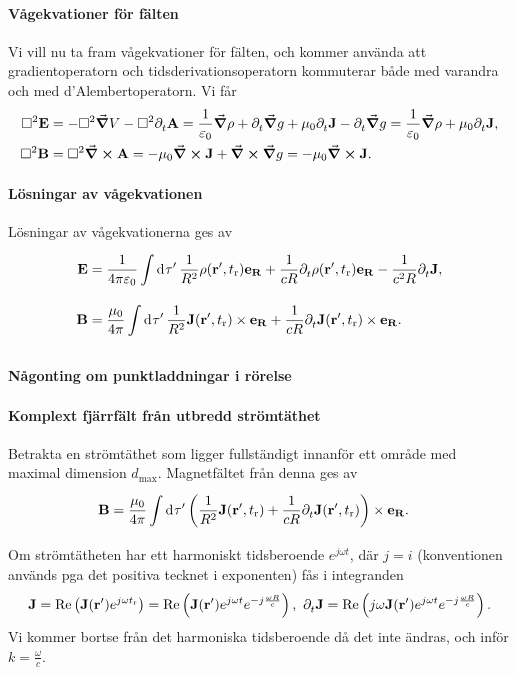 \paragraph{Vågekvationer för fälten}
Vi vill nu ta fram vågekvationer för fälten, och kommer använda att gradientoperatorn och tidsderivationsoperatorn kommuterar både med varandra och med d'Alembertoperatorn. Vi får
\begin{align*}
	\Box^{2}{\vb{E}} &= -\Box^{2}{\grad{V}} - \Box^{2}{\partial_{t}^{}\vb{A}} = \frac{1}{\varepsilon_{0}}\grad{\rho} + \partial_{t}^{}\grad{g} + \mu_{0}\partial_{t}^{}\vb{J} - \partial_{t}^{}\grad{g} = \frac{1}{\varepsilon_{0}}\grad{\rho} + \mu_{0}\partial_{t}^{}\vb{J}, \\
	\Box^{2}{\vb{B}} &= \Box^{2}{\curl{\vb{A}}} = -\mu_{0}\curl{\vb{J}} + \curl{\grad{g}} = -\mu_{0}\curl{\vb{J}}.
\end{align*}

\paragraph{Lösningar av vågekvationen}
Lösningar av vågekvationerna ges av
\begin{align*}
	\vb{E} &= \frac{1}{4\pi\varepsilon_{0}}\int\limits_{}^{}\dd[]{\tau'}\frac{1}{R^{2}}\rho(\vb{r}', t_{\text{r}})\vb{e}_{\vb{R}} + \frac{1}{cR}\partial_{t}^{}\rho(\vb{r}', t_{\text{r}})\vb{e}_{\vb{R}} - \frac{1}{c^{2}R}\partial_{t}^{}\vb{J}, \\
	\vb{B} &= \frac{\mu_{0}}{4\pi}\int\limits_{}^{}\dd[]{\tau'}\frac{1}{R^{2}}\vb{J}(\vb{r}', t_{\text{r}})\times\vb{e}_{\vb{R}} + \frac{1}{cR}\partial_{t}^{}\vb{J}(\vb{r}', t_{\text{r}})\times\vb{e}_{\vb{R}}.
\end{align*}

\paragraph{Någonting om punktladdningar i rörelse}

\paragraph{Komplext fjärrfält från utbredd strömtäthet}
Betrakta en strömtäthet som ligger fullständigt innanför ett område med maximal dimension $d_{\text{max}}$. Magnetfältet från denna ges av
\begin{align*}
	\vb{B} &= \frac{\mu_{0}}{4\pi}\int\limits_{}^{}\dd[]{\tau'}\left(\frac{1}{R^{2}}\vb{J}(\vb{r}', t_{\text{r}}) + \frac{1}{cR}\partial_{t}^{}\vb{J}(\vb{r}', t_{\text{r}})\right)\times\vb{e}_{\vb{R}}.
\end{align*}
Om strömtätheten har ett harmoniskt tidsberoende $e^{j\omega t}$, där $j = i$ (konventionen används pga det positiva tecknet i exponenten) fås i integranden
\begin{align*}
	\vb{J} = \Re\left(\vb{J}(\vb{r}')e^{j\omega t_{\text{r}}}\right) = \Re\left(\vb{J}(\vb{r}')e^{j\omega t}e^{-j\frac{\omega R}{c}}\right),\ \del{t}{\vb{J}} = \Re\left(j\omega\vb{J}(\vb{r}')e^{j\omega t}e^{-j\frac{\omega R}{c}}\right).
\end{align*}
Vi kommer bortse från det harmoniska tidsberoende då det inte ändras, och inför $k = \frac{\omega}{c}$.

